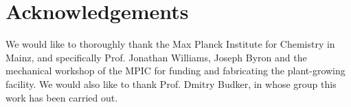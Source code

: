 \documentclass[reprint,superscriptaddress,aps,amsmath,amssymb]{revtex4-1}
\begin{document}
\section*{Acknowledgements}
We would like to thoroughly thank the Max Planck Institute for Chemistry in Mainz, and specifically Prof. Jonathan Williams, Joseph Byron and the mechanical workshop of the MPIC for funding and fabricating the plant-growing facility. We would also like to thank Prof. Dmitry Budker, in whose group this work has been carried out.
\end{document}
